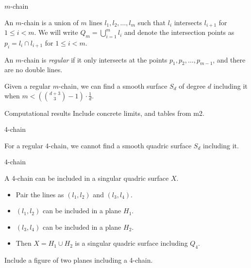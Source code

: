 \documentclass[UKenglish,aspectratio=169]{beamer}
\begin{document}
\begin{frame}{$m$-chain}
    \begin{definition}
        An $m$-chain is a union of $m$ lines $l_1, l_2, \dots, l_m$ such that $l_i$ intersects $l_{i+1}$ for $1 \leq i < m$. We will write $Q_m = \bigcup_{i=1}^m l_i$ and denote the intersection points as $p_i = l_i \cap l_{i+1}$ for $1 \leq i < m$. 
    \end{definition}
    An $m$-chain is \emph{regular} if it only intersects at the points $p_1, p_2, \dots, p_{m-1}$, and there are no double lines.
\end{frame}

\begin{frame}
    \begin{theorem}
        Given a regular $m$-chain, we can find a smooth surface $S_d$ of degree $d$ including it when $m < (\binom{d+3}{3}-1) \cdot \frac{1}{d}$.
    \end{theorem}
\end{frame}

\begin{frame}{Computational results}
    Include concrete limits, and tables from m2.
\end{frame}

\begin{frame}{4-chain}
    \begin{theorem}
        For a regular 4-chain, we cannot find a smooth quadric surface $S_d$ including it.
    \end{theorem}

    \begin{figure}
        \centering
        
    \label{fig:Q_4}
    \end{figure}
\end{frame}

\begin{frame}{4-chain}
    \begin{theorem}
        A 4-chain can be included in a singular quadric surface $X$.
    \end{theorem}

    \begin{itemize}
        \item Pair the lines as $(l_1, l_2)$ and $(l_3, l_4)$.
        \item $(l_1, l_2)$ can be included in a plane $H_1$.
        \item $(l_3, l_4)$ can be included in a plane $H_2$.
        \item Then $X = H_1 \cup H_2$ is a singular quadric surface including $Q_4$.
    \end{itemize}

    Include a figure of two planes including a 4-chain.
\end{frame}
\end{document}
